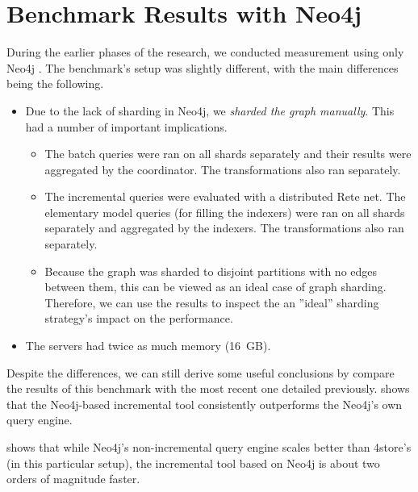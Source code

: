 
\section{Benchmark Results with Neo4j}

During the earlier phases of the research, we conducted measurement using only Neo4j \cite{Izso:2012:ODD:2428516.2428523}. The benchmark's setup was slightly different, with the main differences being the following.

\begin{itemize}
  \item Due to the lack of sharding in Neo4j, we \emph{sharded the graph manually}. This had a number of important implications.
  \begin{itemize}
    \item The batch queries were ran on all shards separately and their results were aggregated by the coordinator. The transformations also ran separately. 
    \item The incremental queries were evaluated with a distributed Rete net. The elementary model queries (for filling the indexers) were ran on all shards separately and aggregated by the indexers. The transformations also ran separately.
    \item Because the graph was sharded to disjoint partitions with no edges between them, this can be viewed as an ideal case of graph sharding. Therefore, we can use the results to inspect the an ''ideal'' sharding strategy's impact on the performance.
  \end{itemize}
  \item The servers had twice as much memory (16~GB).
\end{itemize}

Despite the differences, we can still derive some useful conclusions by compare the results of this benchmark with the most recent one detailed previously.  shows that the Neo4j-based incremental tool consistently outperforms the Neo4j's own query engine.


 shows that while Neo4j's non-incremental query engine scales better than 4store's (in this particular setup), the incremental tool based on Neo4j is about two orders of magnitude faster.

